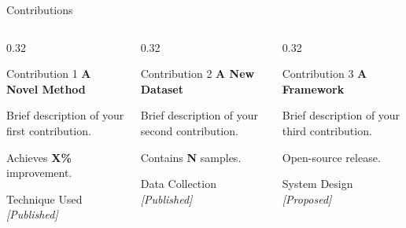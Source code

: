 \begin{frame}{Contributions}

\begin{columns}[T]
\begin{column}{0.32\textwidth}

\begin{contribblock}{Contribution 1}
\textbf{A Novel Method}

\vspace{0.3em}
\small
Brief description of your first contribution.

\vspace{0.2em}
Achieves \textbf{X\%} improvement.

\vspace{0.3em}
{\footnotesize\color{gray}Technique Used}\\
{\footnotesize\textit{[Published]}}
\end{contribblock}

\end{column}

\begin{column}{0.32\textwidth}

\begin{contribblock}{Contribution 2}
\textbf{A New Dataset}

\vspace{0.3em}
\small
Brief description of your second contribution.

\vspace{0.2em}
Contains \textbf{N} samples.

\vspace{0.3em}
{\footnotesize\color{gray}Data Collection}\\
{\footnotesize\textit{[Published]}}
\end{contribblock}

\end{column}

\begin{column}{0.32\textwidth}

\begin{contribblock}{Contribution 3}
\textbf{A Framework}

\vspace{0.3em}
\small
Brief description of your third contribution.

\vspace{0.2em}
Open-source release.

\vspace{0.3em}
{\footnotesize\color{gray}System Design}\\
{\footnotesize\textit{[Proposed]}}
\end{contribblock}

\end{column}
\end{columns}
\end{frame}
